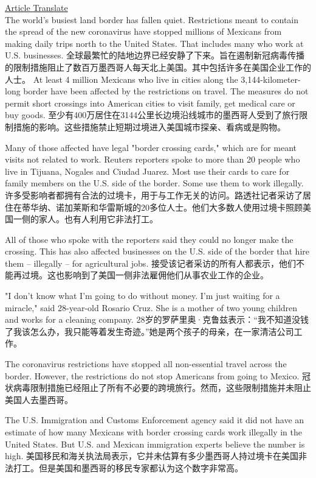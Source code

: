 \href{https://www.51voa.com/VOA_Special_English/us-border-falls-quiet-with-millions-of-mexicans-barred-84264_1.html}{Article Translate} \\
The world's busiest land border has fallen quiet. Restrictions meant to contain the spread of the new coronavirus have stopped millions of Mexicans from making daily trips north to the United States. That includes many who work at U.S. businesses.
全球最繁忙的陆地边界已经安静了下来。旨在遏制新冠病毒传播的限制措施阻止了数百万墨西哥人每天北上美国。其中包括许多在美国企业工作的人士。
At least 4 million Mexicans who live in cities along the 3,144-kilometer-long border have been affected by the restrictions on travel. The measures do not permit short crossings into American cities to visit family, get medical care or buy goods.
至少有400万居住在3144公里长边境沿线城市的墨西哥人受到了旅行限制措施的影响。这些措施禁止短期过境进入美国城市探亲、看病或是购物。

Many of those affected have legal "border crossing cards," which are for meant visits not related to work. Reuters reporters spoke to more than 20 people who live in Tijuana, Nogales and Ciudad Juarez. Most use their cards to care for family members on the U.S. side of the border. Some use them to work illegally.
许多受影响者都拥有合法的过境卡，用于与工作无关的访问。路透社记者采访了居住在蒂华纳、诺加莱斯和华雷斯城的20多位人士。他们大多数人使用过境卡照顾美国一侧的家人。也有人利用它非法打工。

All of those who spoke with the reporters said they could no longer make the crossing. This has also affected businesses on the U.S. side of the border that hire them – illegally – for agricultural jobs.
接受该记者采访的所有人都表示，他们不能再过境。这也影响到了美国一侧非法雇佣他们从事农业工作的企业。

"I don't know what I'm going to do without money. I'm just waiting for a miracle," said 28-year-old Rosario Cruz. She is a mother of two young children and works for a cleaning company.
28岁的罗萨里奥·克鲁兹表示：“我不知道没钱了我该怎么办，我只能等着发生奇迹。”她是两个孩子的母亲，在一家清洁公司工作。

The coronavirus restrictions have stopped all non-essential travel across the border. However, the restrictions do not stop Americans from going to Mexico.
冠状病毒限制措施已经阻止了所有不必要的跨境旅行。然而，这些限制措施并未阻止美国人去墨西哥。

The U.S. Immigration and Customs Enforcement agency said it did not have an estimate of how many Mexicans with border crossing cards work illegally in the United States. But U.S. and Mexican immigration experts believe the number is high.
美国移民和海关执法局表示，它并未估算有多少墨西哥人持过境卡在美国非法打工。但是美国和墨西哥的移民专家都认为这个数字非常高。

